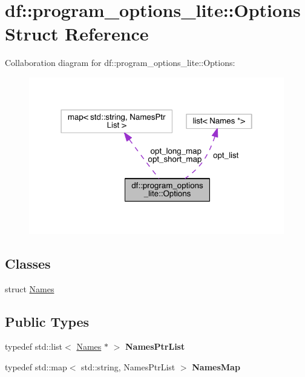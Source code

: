 \hypertarget{structdf_1_1program__options__lite_1_1_options}{}\section{df\+:\+:program\+\_\+options\+\_\+lite\+:\+:Options Struct Reference}
\label{structdf_1_1program__options__lite_1_1_options}


Collaboration diagram for df\+:\+:program\+\_\+options\+\_\+lite\+:\+:Options\+:
\nopagebreak
\begin{figure}[H]
\begin{center}
\leavevmode
\includegraphics[width=316pt]{db/df0/structdf_1_1program__options__lite_1_1_options__coll__graph}
\end{center}
\end{figure}
\subsection*{Classes}
\begin{DoxyCompactItemize}
\item 
struct \hyperlink{structdf_1_1program__options__lite_1_1_options_1_1_names}{Names}
\end{DoxyCompactItemize}
\subsection*{Public Types}
\begin{DoxyCompactItemize}
\item 
\mbox{\label{structdf_1_1program__options__lite_1_1_options_abb4321b12aeeac38f8171ec190e140e7}} 
typedef std\+::list$<$ \hyperlink{structdf_1_1program__options__lite_1_1_options_1_1_names}{Names} $\ast$ $>$ {\bfseries Names\+Ptr\+List}
\item 
\mbox{\label{structdf_1_1program__options__lite_1_1_options_a637581d7ecf751d144bf6eea702c0f74}} 
typedef std\+::map$<$ std\+::string, Names\+Ptr\+List $>$ {\bfseries Names\+Map}
\end{DoxyCompactItemize}
